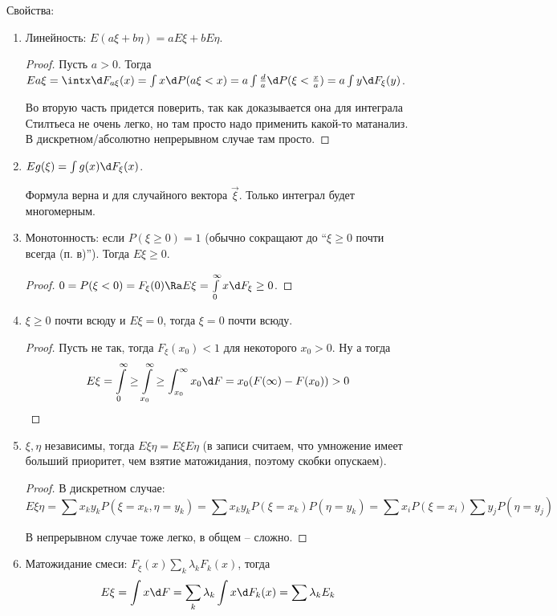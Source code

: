 Свойства:
\begin{enumerate}
\item Линейность: $E(a\xi + b\eta) = aE\xi + bE\eta$.
\begin{proof}
Пусть $a > 0$. Тогда $Ea\xi = \intx \d F_{a\xi}(x) = \int x \d P(a\xi < x) = a \int \frac{d}{a} \d P(\xi < \frac{x}{a}) = a \int y \d F_\xi(y)$.

Во вторую часть придется поверить, так как доказывается она для интеграла Стилтьеса не очень легко, но там просто надо применить какой-то матанализ.
В дискретном/абсолютно непрерывном случае там просто.
\end{proof}
\item $Eg(\xi) = \int g(x) \d F_\xi(x)$.
\begin{Rem}
Формула верна и для случайного вектора $\vec{\xi}$. Только интеграл будет многомерным.
\end{Rem}

\item Монотонность: если $P(\xi \geq 0) = 1$ (обычно сокращают до ``$\xi \geq 0$ почти всегда (п. в)''). Тогда $E\xi \geq 0$.
\begin{proof}
$0 = P(\xi < 0) = F_\xi(0) \Ra E\xi = \int\limits_0^{\infty}x \d F_\xi \geq 0$.
\end{proof}

\item $\xi \geq 0$ почти всюду и $E\xi = 0$, тогда $\xi = 0$ почти всюду.
\begin{proof}
Пусть не так, тогда $F_\xi(x_0) < 1$ для некоторого $x_0 > 0$. 
Ну а тогда $$E\xi = \int\limits_0^{\infty} \geq \int\limits_{x_0}^\infty \geq  \int_{x_0}^\infty x_0 \d F = x_0 (F(\infty) - F(x_0)) > 0$$
\end{proof}

\item $\xi, \eta$ независимы, тогда $E\xi\eta = E\xi E\eta$ (в записи считаем, что умножение имеет больший приоритет, чем взятие матожидания, поэтому скобки опускаем).
\begin{proof}
В дискретном случае: $$E\xi\eta = \sum x_k y_k P(\xi = x_k, \eta = y_k) = \sum x_k y_k P(\xi = x_k) P(\eta = y_k) = \sum x_i P(\xi = x_i) \sum y_j P(\eta = y_j)$$

В непрерывном случае тоже легко, в общем -- сложно.
\end{proof}

\item Матожидание смеси: $F_\xi(x) \sum\limits_k \lambda_kF_k(x)$, тогда $$E\xi = \int x \d F = \sum\limits_k \lambda_k \int x \d F_k(x) = \sum \lambda_k E_k$$
\end{enumerate}

